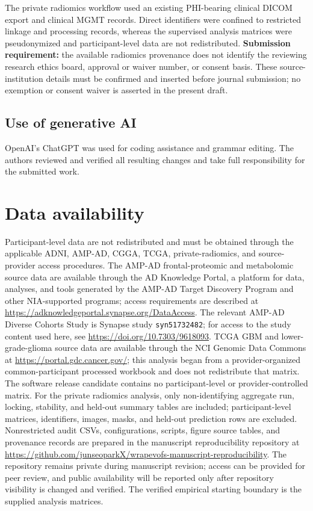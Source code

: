 The private radiomics workflow used an existing PHI-bearing clinical DICOM export and clinical MGMT records. Direct identifiers were confined to restricted linkage and processing records, whereas the supervised analysis matrices were pseudonymized and participant-level data are not redistributed. \textbf{Submission requirement:} the available radiomics provenance does not identify the reviewing research ethics board, approval or waiver number, or consent basis. These source-institution details must be confirmed and inserted before journal submission; no exemption or consent waiver is asserted in the present draft.

\subsection{Use of generative AI}

OpenAI's ChatGPT was used for coding assistance and grammar editing. The authors reviewed and verified all resulting changes and take full responsibility for the submitted work.

\FloatBarrier
\section{Data availability}

Participant-level data are not redistributed and must be obtained through the applicable ADNI, AMP-AD, CGGA, TCGA, private-radiomics, and source-provider access procedures. The AMP-AD frontal-proteomic and metabolomic source data are available through the AD Knowledge Portal, a platform for data, analyses, and tools generated by the AMP-AD Target Discovery Program and other NIA-supported programs; access requirements are described at \url{https://adknowledgeportal.synapse.org/DataAccess}. The relevant AMP-AD Diverse Cohorts Study is Synapse study \texttt{syn51732482}; for access to the study content used here, see \url{https://doi.org/10.7303/9618093}. TCGA GBM and lower-grade-glioma source data are available through the NCI Genomic Data Commons at \url{https://portal.gdc.cancer.gov/}; this analysis began from a provider-organized common-participant processed workbook and does not redistribute that matrix. The software release candidate contains no participant-level or provider-controlled matrix. For the private radiomics analysis, only non-identifying aggregate run, locking, stability, and held-out summary tables are included; participant-level matrices, identifiers, images, masks, and held-out prediction rows are excluded. Nonrestricted audit CSVs, configurations, scripts, figure source tables, and provenance records are prepared in the manuscript reproducibility repository at \url{https://github.com/junseoparkX/wrapevofs-manuscript-reproducibility}. The repository remains private during manuscript revision; access can be provided for peer review, and public availability will be reported only after repository visibility is changed and verified. The verified empirical starting boundary is the supplied analysis matrices.


